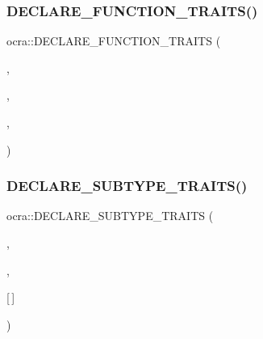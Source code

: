 \hypertarget{namespaceocra_a4710be16a5cdd3678d4f26f155ce6774}{}\label{namespaceocra_a4710be16a5cdd3678d4f26f155ce6774} 
\subsubsection{\texorpdfstring{D\+E\+C\+L\+A\+R\+E\+\_\+\+F\+U\+N\+C\+T\+I\+O\+N\+\_\+\+T\+R\+A\+I\+T\+S()}{DECLARE\_FUNCTION\_TRAITS()}\hspace{0.1cm}{\footnotesize\ttfamily [13/13]}}
{\footnotesize\ttfamily ocra\+::\+D\+E\+C\+L\+A\+R\+E\+\_\+\+F\+U\+N\+C\+T\+I\+O\+N\+\_\+\+T\+R\+A\+I\+TS (\begin{DoxyParamCaption}\item[{$<$ \hyperlink{namespaceocra_a40ddbec106a6034cd2047bba9945b568a3ba52241c6443b7205f52eb7c7e3e04c}{P\+A\+R\+T\+I\+A\+L\+\_\+\+X\+\_\+\+D\+O\+T\+\_\+\+X\+\_\+\+D\+OT} $>$}]{,  }\item[{Vector\+Xd}]{,  }\item[{update\+Jdot\+Xdot}]{,  }\item[{\hyperlink{namespaceocra_a40ddbec106a6034cd2047bba9945b568a3ba52241c6443b7205f52eb7c7e3e04c}{P\+A\+R\+T\+I\+A\+L\+\_\+\+X\+\_\+\+D\+O\+T\+\_\+\+X\+\_\+\+D\+OT}}]{ }\end{DoxyParamCaption})}

\hypertarget{namespaceocra_a1f55d05eac986f62fad9b7451d42159c}{}\label{namespaceocra_a1f55d05eac986f62fad9b7451d42159c} 
\subsubsection{\texorpdfstring{D\+E\+C\+L\+A\+R\+E\+\_\+\+S\+U\+B\+T\+Y\+P\+E\+\_\+\+T\+R\+A\+I\+T\+S()}{DECLARE\_SUBTYPE\_TRAITS()}\hspace{0.1cm}{\footnotesize\ttfamily [1/3]}}
{\footnotesize\ttfamily ocra\+::\+D\+E\+C\+L\+A\+R\+E\+\_\+\+S\+U\+B\+T\+Y\+P\+E\+\_\+\+T\+R\+A\+I\+TS (\begin{DoxyParamCaption}\item[{Vector\+Xd}]{,  }\item[{double}]{,  }\item[{operator}]{\mbox{[}$\,$\mbox{]} }\end{DoxyParamCaption})}


